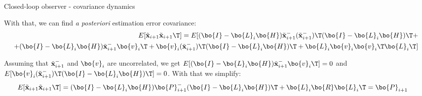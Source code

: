 \documentclass{beamer}
\newcommand{\btil}[1] {\Tilde{\mathbf{#1}}}
\begin{document}
\begin{frame}{Closed-loop observer - covariance dynamics}
	\begin{flushleft}
		
		
		With that, we can find \emph{a posteriori} estimation error covariance:
		\begin{align*}
			E[\btil{x}_{i+1} \btil{x}_{i+1}\T] 
			=
			E[ (\bo{I} - \bo{L}_i \bo{H}) \btil{x}_{i+1}^- (\btil{x}_{i+1}^-)\T (\bo{I} - \bo{L}_i \bo{H})\T + \\
			+(\bo{I} - \bo{L}_i \bo{H}) \btil{x}_{i+1}^- \bo{v}_i\T +
			\bo{v}_i (\btil{x}_{i+1}^-)\T (\bo{I} - \bo{L}_i \bo{H})\T +
			\bo{L}_i \bo{v}_i \bo{v}_i\T \bo{L}_i\T]
		\end{align*}
		
		Assuming that $\btil{x}_{i+1}^-$ and $\bo{v}_i$ are uncorrelated, we get $E[(\bo{I} - \bo{L}_i \bo{H}) \btil{x}_{i+1}^- \bo{v}_i\T] = 0$ and $E[\bo{v}_i (\btil{x}_{i+1}^-)\T (\bo{I} - \bo{L}_i \bo{H})\T] = 0$. With that we simplify:
		\begin{align*}
			E[\btil{x}_{i+1} \btil{x}_{i+1}\T] 
			&=
			(\bo{I} - \bo{L}_i \bo{H}) \bo{P}_{i+1}^- (\bo{I} - \bo{L}_i \bo{H})\T +\bo{L}_i\bo{R}\bo{L}_i\T = \bo{P}_{i+1}
		\end{align*}
		
	\end{flushleft}
\end{frame}






\begin{frame}
	\begin{flushleft}
		
		
	\end{flushleft}
\end{frame}
\end{document}
